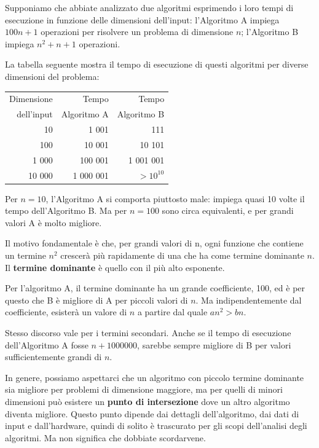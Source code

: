 \documentclass[10pt]{book}
\begin{document}
Supponiamo che abbiate analizzato due algoritmi esprimendo i loro tempi di esecuzione in funzione delle dimensioni dell'input: l'Algoritmo A impiega $100n+1$ operazioni per risolvere un problema di dimensione $n$; l'Algoritmo B impiega $n^2 + n + 1$ operazioni.

La tabella seguente mostra il tempo di esecuzione di questi algoritmi per diverse dimensioni del problema:

\begin{tabular}{|r|r|r|}
\hline
Dimensione &   Tempo          & Tempo \\
dell'input	   &   Algoritmo A    & Algoritmo B \\
\hline
10        &   1 001           & 111         \\
100       &   10 001          & 10 101         \\
1 000     &   100 001         & 1 001 001         \\
10 000    &   1 000 001       & $> 10^{10}$         \\
\hline
\end{tabular}

Per $n=10$, l'Algoritmo A si comporta piuttosto male: impiega quasi 10 volte il tempo dell'Algoritmo B.  Ma per $n=100$ sono circa equivalenti, e per grandi valori A è molto migliore.

Il motivo fondamentale è che, per grandi valori di n, ogni funzione che contiene un termine $n^2$ crescerà più rapidamente di una che ha come termine dominante $n$.  Il {\bf termine dominante} è quello con il più alto esponente.

Per l'algoritmo A, il termine dominante ha un grande coefficiente, 100, ed è per questo che B è migliore di A per piccoli valori di $n$.  Ma indipendentemente dal coefficiente, esisterà un valore di $n$ a partire dal quale
$a n^2 > b n$.

Stesso discorso vale per i termini secondari. Anche se il tempo di esecuzione dell'Algoritmo A fosse $n+1000000$, sarebbe sempre migliore di B per valori sufficientemente grandi di $n$.

In genere, possiamo aspettarci che un algoritmo con piccolo termine dominante sia migliore per problemi di dimensione maggiore, ma per quelli di minori dimensioni può esistere un {\bf punto di intersezione} dove un altro algoritmo diventa migliore. Questo punto dipende dai dettagli dell'algoritmo, dai dati di input e dall'hardware, quindi di solito è trascurato per gli scopi dell'analisi degli algoritmi. Ma non significa che dobbiate scordarvene.
\end{document}
